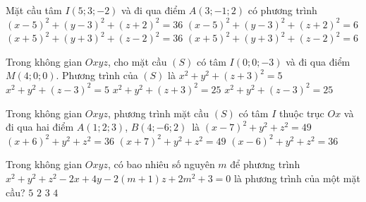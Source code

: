 \begin{ex}%
	Mặt cầu tâm $I\left(5;3;-2\right)$ và đi qua điểm  $A\left(3;-1;2\right)$ có phương trình
	 \choice
		{\True  $\left(x-5\right)^2+\left(y-3\right)^2+\left(z+2\right)^2=36$}
		{$\left(x-5\right)^2+\left(y-3\right)^2+\left(z+2\right)^2=6$} 
		{$\left(x+5\right)^2+\left(y+3\right)^2+\left(z-2\right)^2=36$} 
		 {$\left(x+5\right)^2+\left(y+3\right)^2+\left(z-2\right)^2=6$}
\end{ex}

\begin{ex}%
	Trong không  gian $Oxyz$, cho mặt cầu $(S)$ có tâm $I\left(0;0;-3\right)$ và đi qua điểm $M\left(4;0;0\right)$. Phương trình của $(S)$ là
	\choice 
		 {$x^2+y^2+\left(z+3\right)^2=5$}
		{$x^2+y^2+\left(z-3\right)^2=5$} 
		{\True  $x^2+y^2+\left(z+3\right)^2=25$}
		 {$x^2+y^2+\left(z-3\right)^2=25$}
\end{ex}

\begin{ex}%
	Trong  không gian $Oxyz$, phương trình mặt cầu $(S)$ có tâm $I$ thuộc trục $Ox$ và đi qua hai điểm $A(1;2;3)$, $B(4;-6;2)$~là
	\choice 
		{\True $(x-7)^2 +y^2  +z^2 =49$}
		{$(x+6)^2 +y^2  +z^2 =36$}
		 {$(x+7)^2 +y^2 +z^2 =49$}
		{$(x-6)^2 +y^2 +z^2 =36$} 
\end{ex}

\begin{ex}%
	Trong không gian $Oxyz$, có  bao nhiêu số nguyên $m$ để phương trình $x^2+y^2+z^2-2x+4y-2(m+1)z+2m^2+3=0$ là phương trình của một mặt cầu?
	 \choice
		 {$5$}
		{$2$} 
		 {\True $3$}
		{$4$} 
\end{ex}

